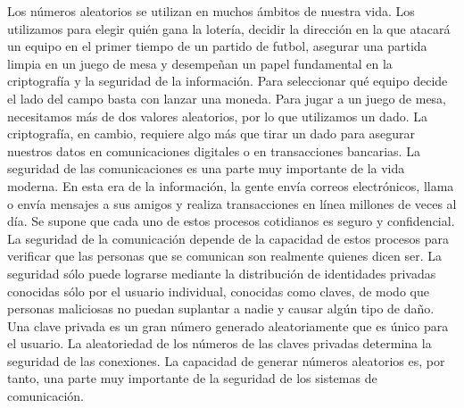                 \vspace{0.4cm}
                
\begin{comment}

Datos para programar la tarjeta

Default Board: Basys3
Default Part: xc7a35tcpg236-1
Product: Artix-7
Family: Artix-7
Package: cpg236
Speed Grade: -1

\end{comment}

    


	Los números aleatorios se utilizan en muchos ámbitos de nuestra vida. Los utilizamos para elegir quién gana la lotería, decidir la dirección en la que atacará un equipo en el primer tiempo de un partido de futbol, asegurar una partida limpia en un juego de mesa y desempeñan un papel fundamental en la criptografía y la seguridad de la información. Para seleccionar qué equipo decide el lado del campo basta con lanzar una moneda. Para jugar a un juego de mesa, necesitamos más de dos valores aleatorios, por lo que utilizamos un dado. La criptografía, en cambio, requiere algo más que tirar un dado para asegurar nuestros datos en comunicaciones digitales o en transacciones bancarias. La seguridad de las comunicaciones es una parte muy importante de la vida moderna. En esta era de la información, la gente envía correos electrónicos, llama o envía mensajes a sus amigos y realiza transacciones en línea millones de veces al día. Se supone que cada uno de estos procesos cotidianos es seguro y confidencial. La seguridad de la comunicación depende de la capacidad de estos procesos para verificar que las personas que se comunican son realmente quienes dicen ser. La seguridad sólo puede lograrse mediante la distribución de identidades privadas conocidas sólo por el usuario individual, conocidas como claves, de modo que personas maliciosas no puedan suplantar a nadie y causar algún tipo de daño. Una clave privada es un gran número generado aleatoriamente que es único para el usuario. La aleatoriedad de los números de las claves privadas determina la seguridad de las conexiones. La capacidad de generar números aleatorios es, por tanto, una parte muy importante de la seguridad de los sistemas de comunicación.

